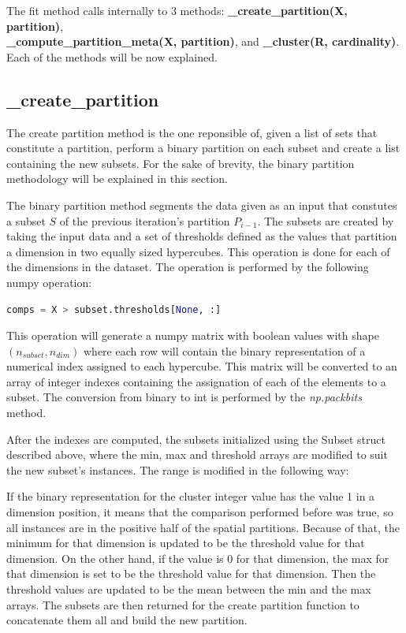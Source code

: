 The fit method calls internally to 3 methods: \textbf{\_create\_partition(X, partition)}, \\ \textbf{\_compute\_partition\_meta(X, partition)}, and \textbf{\_cluster(R, cardinality)}. Each of the methods will be now explained.

\subsection{\_create\_partition}
The create partition method is the one reponsible of, given a list of sets that constitute a partition, perform a binary partition on each subset and create a list containing the new subsets. For the sake of brevity, the binary partition methodology will be explained in this section.

The binary partition method segments the data given as an input that constutes a subset $S$ of the previous iteration's partition $P_{i-1}$. The subsets are created by taking the input data and a set of thresholds defined as the values that partition a dimension in two equally sized hypercubes. This operation is done for each of the dimensions in the dataset. The operation is performed by the following numpy operation: 

\begin{lstlisting}[language=python]
comps = X > subset.thresholds[None, :]
\end{lstlisting}

This operation will generate a numpy matrix with boolean values with shape $(n_{subset}, n_{dim})$ where each row will contain the binary representation of a numerical index assigned to each hypercube. This matrix will be converted to an array of integer indexes containing the assignation of each of the elements to a subset. The conversion from binary to int is performed by the \textit{np.packbits} method.

After the indexes are computed, the subsets initialized using the Subset struct described above, where the min, max and threshold arrays are modified to suit the new subset's instances. The range is modified in the following way:

If the binary representation for the cluster integer value has the value 1 in a dimension position, it means that the comparison performed before was true, so all instances are in the positive half of the spatial partitions. Because of that, the minimum for that dimension is updated to be the threshold value for that dimension. On the other hand, if the value is 0 for that dimension, the max for that dimension is set to be the threshold value for that dimension. Then the threshold values are updated to be the mean between the min and the max arrays. The subsets are then returned for the create partition function to concatenate them all and build the new partition.

